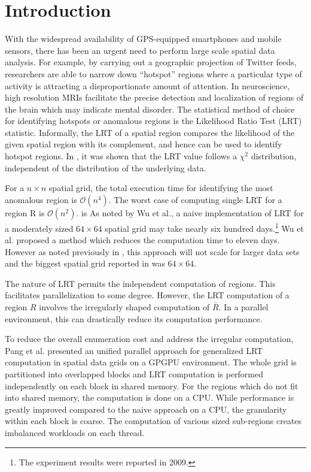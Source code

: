 \documentclass[AMA,LATO1COL]{WileyNJD-v2-bak}
\newcommand\bigo{\mathcal O}
\begin{document}
\maketitle

\section{Introduction}\label{sec1}
With the widespread availability of GPS-equipped smartphones and mobile
sensors, there has been an urgent need to perform large scale spatial data analysis.
For example, by carrying
out a geographic projection of Twitter feeds, researchers are able to
narrow down ``hotspot'' regions where a particular type of activity is attracting a disproportionate  amount of attention. In neuroscience, high resolution MRIs facilitate the precise detection and localization of regions of the brain which may indicate mental disorder.
The statistical method of choice for identifying hotspots or anomalous regions
is the Likelihood Ratio Test (LRT) statistic.
Informally, the LRT of a spatial region compares the likelihood of the given spatial region with its complement, and hence can be used to identify hotspot regions. In \cite{chisquare}, it was shown that the LRT value follows a $\chi^{2}$ distribution, independent of the distribution of the underlying data.

\noindent For a $n\times n$ spatial grid, the total execution time for identifying the most
anomalous region is $\bigo(n^4)$. The worst case of computing
single LRT for a region R is $\bigo(n^2)$. is As noted by Wu et al.\cite{jour}, a naive implementation of LRT for a moderately sized $64 \times 64$  spatial grid may take nearly six hundred days.\footnote{The experiment results were  reported in  2009.} Wu et al.\cite{jour} proposed a method which reduces the computation time to eleven days. However as noted previously in \cite{ADMA}, this approach will not scale for larger data sets and the biggest spatial grid reported in\cite{jour} was $64 \times  64$.

\noindent The nature of LRT permits the independent computation of regions. This facilitates parallelization to some degree. However, the LRT computation of a region $R$ involves the irregularly shaped computation of $\bar R$\cite{apweb}. In a parallel environment, this can drastically reduce its computation performance\cite{irregular1,irregular2,irregular3}.

\noindent To reduce the overall enumeration cost and address the irregular computation, Pang et al.\cite{apweb} presented an unified parallel approach for generalized LRT computation in spatial data grids on a GPGPU environment. The whole grid is partitioned into overlapped blocks and LRT computation is performed independently on each block in shared memory. For the regions which do not fit into shared memory, the computation is done on a CPU. While performance is greatly improved compared to the naive approach on a CPU, the granularity within each block is coarse. The computation of various sized sub-regions creates imbalanced workloads on each thread.
\end{document}
